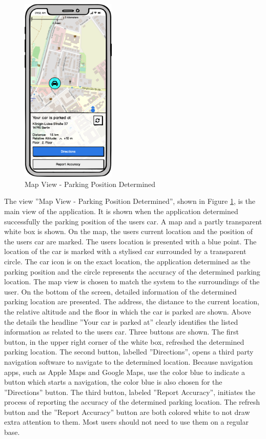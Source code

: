 \begin{figure}[h]
    \centering
    \includegraphics[width=0.4\textwidth]{images/UI/Iteration4-MapView-ParkingPositionDetermined.png}
    \caption{Map View - Parking Position Determined}
    \label{fig:mv-parking}
\end{figure}

The view ''Map View - Parking Position Determined'', shown in Figure \ref{fig:mv-parking}, is the main view of the application. It is shown when the application determined successfully the parking position of the users car. A map and a partly transparent white box is shown. On the map, the users current location and the position of the users car are marked. The users location is presented with a blue point. The location of the car is marked with a stylised car surrounded by a transparent circle. The car icon is on the exact location, the application determined as the parking position and the circle represents the accuracy of the determined parking location. The map view is chosen to match the system to the surroundings of the user. On the bottom of the screen, detailed information of the determined parking location are presented. The address, the distance to the current location, the relative altitude and the floor in which the car is parked are shown. Above the details the headline ''Your car is parked at'' clearly identifies the listed information as related to the users car. Three buttons are shown. The first button, in the upper right corner of the white box, refreshed the determined parking location. The second button, labelled ''Directions'', opens a third party navigation software to navigate to the determined location. Because navigation apps, such as Apple Maps and Google Maps, use the color blue to indicate a button which starts a navigation, the color blue is also chosen for the ''Directions'' button. The third button, labeled ''Report Accuracy'', initiates the process of reporting the accuracy of the determined parking location. The refresh button and the ''Report Accuracy'' button are both colored white to not draw extra attention to them. Most users should not need to use them on a regular base. \cite{nielsen1994usability}


